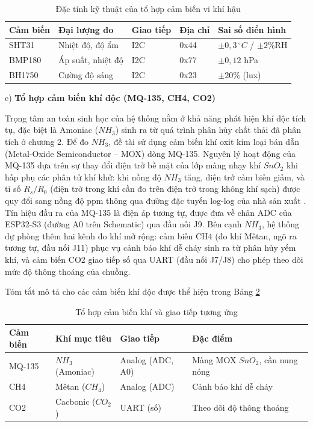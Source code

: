 \begin{table}[H]
\centering
\caption{Đặc tính kỹ thuật của tổ hợp cảm biến vi khí hậu}
\label{Bảng 3.2}
\renewcommand{\arraystretch}{1.4}
\begin{tabular}{p{2.4cm} p{3.0cm} p{2.2cm} p{2.0cm} p{3.4cm}}
\hline
\textbf{Cảm biến} & \textbf{Đại lượng đo} & \textbf{Giao tiếp} & \textbf{Địa chỉ} & \textbf{Sai số điển hình} \\ \hline
SHT31 & Nhiệt độ, độ ẩm & I2C & 0x44 & $\pm 0{,}3\,^\circ C$ / $\pm 2\%$RH \\ 
BMP180 & Áp suất, nhiệt độ & I2C & 0x77 & $\pm 0{,}12$ hPa \\ 
BH1750 & Cường độ sáng & I2C & 0x23 & $\pm 20\%$ (lux) \\ \hline
\end{tabular}
\end{table}

e) \textbf{Tổ hợp cảm biến khí độc (MQ-135, CH4, CO2)}

Trọng tâm an toàn sinh học của hệ thống nằm ở khả năng phát hiện khí độc tích tụ, đặc biệt là Amoniac ($NH_3$) sinh ra từ quá trình phân hủy chất thải đã phân tích ở chương 2. Để đo $NH_3$, đề tài sử dụng cảm biến khí oxit kim loại bán dẫn (Metal-Oxide Semiconductor -- MOX) dòng MQ-135. Nguyên lý hoạt động của MQ-135 dựa trên sự thay đổi điện trở bề mặt của lớp màng nhạy khí $SnO_2$ khi hấp phụ các phân tử khí khử: khi nồng độ $NH_3$ tăng, điện trở cảm biến giảm, và tỉ số $R_s/R_0$ (điện trở trong khí cần đo trên điện trở trong không khí sạch) được quy đổi sang nồng độ ppm thông qua đường đặc tuyến log-log của nhà sản xuất \cite{barsan2001conduction}. Tín hiệu đầu ra của MQ-135 là điện áp tương tự, được đưa về chân ADC của ESP32-S3 (đường A0 trên Schematic) qua đầu nối J9. Bên cạnh $NH_3$, hệ thống dự phòng thêm hai kênh đo khí mở rộng: cảm biến CH4 (đo khí Mêtan, ngõ ra tương tự, đầu nối J11) phục vụ cảnh báo khí dễ cháy sinh ra từ phân hủy yếm khí, và cảm biến CO2 giao tiếp số qua UART (đầu nối J7/J8) cho phép theo dõi mức độ thông thoáng của chuồng.

Tóm tắt mô tả cho các cảm biến khí độc được thể hiện trong Bảng \ref{Bảng 3.3}
\begin{table}[H]
\centering
\caption{Tổ hợp cảm biến khí và giao tiếp tương ứng}
\label{Bảng 3.3}
\renewcommand{\arraystretch}{1.4}
\begin{tabular}{p{2.6cm} p{3.2cm} p{2.6cm} p{4.2cm}}
\hline
\textbf{Cảm biến} & \textbf{Khí mục tiêu} & \textbf{Giao tiếp} & \textbf{Đặc điểm} \\ \hline
MQ-135 & $NH_3$ (Amoniac) & Analog (ADC, A0) & Màng MOX $SnO_2$, cần nung nóng \\ 
CH4 & Mêtan ($CH_4$) & Analog (ADC) & Cảnh báo khí dễ cháy \\ 
CO2 & Cacbonic ($CO_2$) & UART (số) & Theo dõi độ thông thoáng \\ \hline
\end{tabular}
\end{table}

